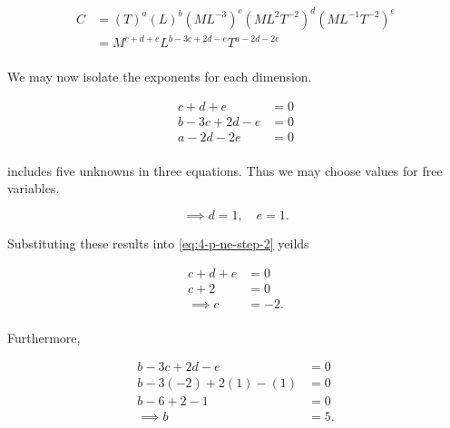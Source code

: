 \documentclass[12pt]{article}
\begin{document}
  \begin{equation}
    \label{eq:4-p-ne-step-1}
    \begin{aligned}
      C &= (T)^a(L)^b(ML^{-3})^c(ML^2T^{-2})^d(ML^{-1}T^{-2})^e \\
        &= M^{c+d+e}L^{b-3c+2d-e}T^{a-2d-2e} \\
    \end{aligned}
  \end{equation}

  We may now isolate the exponents for each dimension.

  \begin{equation}
    \label{eq:4-p-ne-step-2}
    \begin{aligned}
      c + d + e &= 0 \\
      b - 3c + 2d - e &= 0 \\
      a - 2d - 2e &= 0 \\
    \end{aligned}
  \end{equation}

   includes five unknowns in three equations. Thus we may
  choose values for free variables.

  \begin{equation}
    \label{eq:4-p-ne-step-3-de}
    \implies d=1, \quad e=1.
  \end{equation}

  Substituting these results into \cref{eq:4-p-ne-step-2} yeilds

  \begin{equation}
    \label{eq:4-p-ne-step-3-c}
    \begin{aligned}
      c+d+e &= 0\\
      c + 2 &= 0\\
      \implies c &= -2.\\
    \end{aligned}
  \end{equation}

  Furthermore,

  \begin{equation}
    \label{eq:4-p-ne-step-3-b}
    \begin{aligned}
      b-3c+2d-e&=0\\
      b-3(-2)+2(1)-(1)&=0 \\
      b-6+2-1&=0 \\
      \implies b&=5.\\
    \end{aligned}
  \end{equation}
\end{document}
